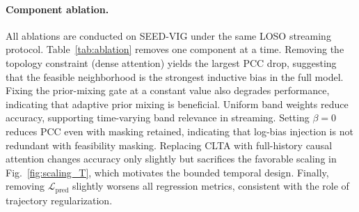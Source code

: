 \documentclass[preprint,12pt]{elsarticle}
\begin{document}
\paragraph{Component ablation.}
All ablations are conducted on SEED-VIG under the same LOSO streaming protocol.
Table~\ref{tab:ablation} removes one component at a time.
Removing the topology constraint (dense attention) yields the largest PCC drop,
suggesting that the feasible neighborhood is the strongest inductive bias in the full model.
Fixing the prior-mixing gate at a constant value also degrades performance,
indicating that adaptive prior mixing is beneficial.
Uniform band weights reduce accuracy, supporting time-varying band relevance in streaming.
Setting $\beta{=}0$ reduces PCC even with masking retained, indicating that log-bias injection is not redundant with feasibility masking.
Replacing CLTA with full-history causal attention changes accuracy only slightly but sacrifices the favorable scaling in Fig.~\ref{fig:scaling_T},
which motivates the bounded temporal design.
Finally, removing $\mathcal{L}_{\mathrm{pred}}$ slightly worsens all regression metrics,
consistent with the role of trajectory regularization.
\end{document}
